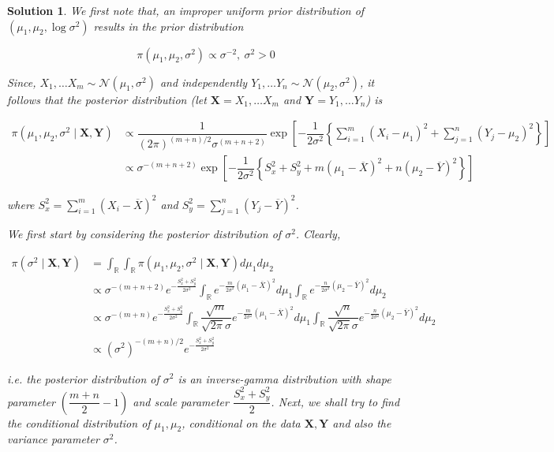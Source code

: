 \documentclass[12pt]{article}
\theoremstyle{problemstyle}
\newtheorem*{solution*}{Solution}
\newcommand{\normal}{\mathcal{N}}
\newcommand{\R}{\mathbb{R}}
\begin{document}
\begin{solution*}
    We first note that, an improper uniform prior distribution of $(\mu_1, \mu_2, \log \sigma^2)$ results in the prior distribution 

    $$
    \pi(\mu_1, \mu_2, \sigma^2) \propto \sigma^{-2}, \ \sigma^2 > 0
    $$

    Since, $X_1, \dots X_m \sim \normal(\mu_1, \sigma^2)$ and independently $Y_1, \dots Y_n \sim \normal(\mu_2, \sigma^2)$, it follows that the posterior distribution (let $\boldsymbol{X} = X_1, \dots X_m$ and $\boldsymbol{Y} = Y_1, \dots Y_n$) is

    \begin{align*}
        \pi(\mu_1, \mu_2, \sigma^2 \mid \boldsymbol{X}, \boldsymbol{Y})
        & \propto \dfrac{1}{(2\pi)^{(m+n)/2} \sigma^{(m+n+2)}} \exp\left[ -\dfrac{1}{2\sigma^2}\left\{ \sum_{i=1}^m (X_i - \mu_1)^2 + \sum_{j=1}^n (Y_j - \mu_2)^2 \right\} \right]\\
        & \propto \sigma^{-(m+n+2)} \exp\left[ -\dfrac{1}{2\sigma^2} \left\{ S_x^2 + S_y^2 + m(\mu_1 - \overline{X})^2 + n(\mu_2 - \overline{Y})^2 \right\} \right]
    \end{align*}

    where $S_x^2 = \sum_{i=1}^m (X_i - \overline{X})^2$ and $S_y^2 = \sum_{j=1}^n (Y_j - \overline{Y})^2$. 
    
    We first start by considering the posterior distribution of $\sigma^2$. Clearly,

    \begin{align*}
        \pi(\sigma^2 \mid \boldsymbol{X}, \boldsymbol{Y})
        & = \int_{\R} \int_{\R} \pi(\mu_1, \mu_2, \sigma^2 \mid \boldsymbol{X}, \boldsymbol{Y}) d\mu_1 d\mu_2\\
        & \propto \sigma^{-(m+n+2)} e^{-\frac{S_x^2 + S_y^2}{2\sigma^2}} \int_{\R} e^{-\frac{m}{2\sigma^2}(\mu_1 - \overline{X})^2} d\mu_1 \int_{\R} e^{-\frac{n}{2\sigma^2}(\mu_2 - \overline{Y})^2} d\mu_2\\
        & \propto \sigma^{-(m+n)} e^{-\frac{S_x^2 + S_y^2}{2\sigma^2}} \int_{\R} \dfrac{\sqrt{m}}{\sqrt{2\pi}\sigma} e^{-\frac{m}{2\sigma^2}(\mu_1 - \overline{X})^2} d\mu_1 \int_{\R} \dfrac{\sqrt{n}}{\sqrt{2\pi}\sigma} e^{-\frac{n}{2\sigma^2}(\mu_2 - \overline{Y})^2} d\mu_2\\
        & \propto (\sigma^2)^{-(m+n)/2} e^{-\frac{S_x^2 + S_y^2}{2\sigma^2}}
    \end{align*}

    i.e. the posterior distribution of $\sigma^2$ is an inverse-gamma distribution with shape parameter $\left( \dfrac{m+n}{2} - 1 \right)$ and scale parameter $\dfrac{S_x^2 + S_y^2}{2}$. Next, we shall try to find the conditional distribution of $\mu_1, \mu_2$, conditional on the data $\boldsymbol{X}, \boldsymbol{Y}$ and also the variance parameter $\sigma^2$. 


\end{solution*}
\end{document}

